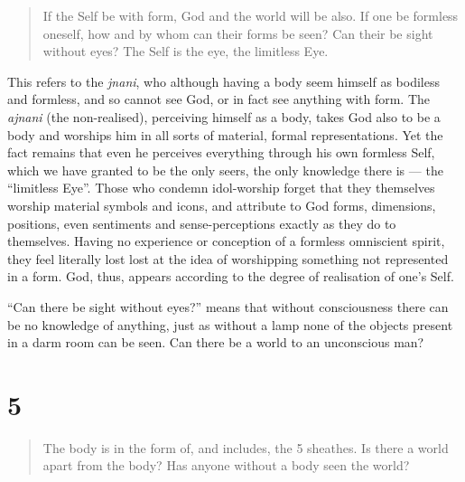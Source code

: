 \documentclass[12pt]{report}
\begin{document}
\begin{quote}
If the Self be with form, God and the world will be also. If one be
formless oneself, how and by whom can their forms be seen? Can their
be sight without eyes? The Self is the eye, the limitless Eye.
\end{quote}


This refers to the \emph{jnani}, who although having a body seem
himself as bodiless and formless, and so cannot see God, or in fact
see anything with form. The \emph{ajnani} (the non-realised),
perceiving himself as a body, takes God also to be a body and worships
him in all sorts of material, formal representations. Yet the fact
remains that even he perceives everything through his own formless
Self, which we have granted to be the only seers, the only knowledge
there is --- the ``limitless Eye''. Those who condemn idol-worship
forget that they themselves worship material symbols and icons, and
attribute to God forms, dimensions, positions, even sentiments and
sense-perceptions exactly as they do to themselves. Having no
experience or conception of a formless omniscient spirit, they feel
literally lost lost at the idea of worshipping something not
represented in a form. God, thus, appears according to the degree of
realisation of one's Self.

``Can there be sight without eyes?'' means that without consciousness
there can be no knowledge of anything, just as without a lamp none of
the objects present in a darm room can be seen. Can there be a world
to an unconscious man?

\section{5}

\begin{quote}
The body is in the form of, and includes, the 5 sheathes. Is there a
world apart from the body? Has anyone without a body seen the world?
\end{quote}

\end{document}
